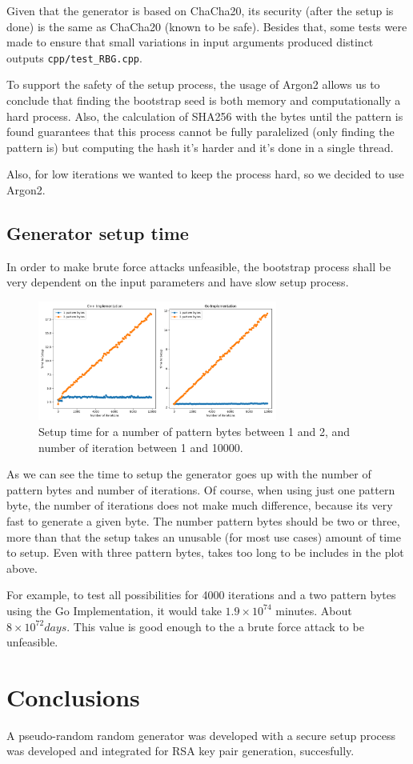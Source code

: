 \documentclass{article} %
\begin{document}
Given that the generator is based on ChaCha20, its security (after the setup is done) is the same as ChaCha20 (known to be safe). Besides that, some tests were made to ensure that small variations in input arguments produced distinct outputs \texttt{cpp/test\_RBG.cpp}.

To support the safety of the setup process, the usage of Argon2 allows us to conclude that finding the bootstrap seed is both memory and computationally a hard process. Also, the calculation of SHA256 with the bytes until the pattern is found guarantees that this process cannot be fully paralelized (only finding the pattern is) but computing the hash it's harder and it's done in a single thread.

Also, for low iterations we wanted to keep the process hard, so we decided to use Argon2.
\subsection{Generator setup time}
In order to make brute force attacks unfeasible, the bootstrap process shall be very dependent on the input parameters and have slow setup process.

\begin{figure}[!ht]
  \label{figure:apache_headers}
  \centering
  \includegraphics[width=0.7\textwidth]{assets/randgen_plot1.png}
  \caption{Setup time for a number of pattern bytes between 1 and 2, and number of iteration between 1 and 10000.}
\end{figure}

As we can see the time to setup the generator goes up with the number of pattern bytes and number of iterations. Of course, when using 
just one pattern byte, the number of iterations does not make much difference, because its very fast to generate a given byte. The number pattern bytes
should be two or three, more than that the setup takes an unusable (for most use cases) amount of time to setup. Even with three pattern bytes, takes too long
to be includes in the plot above.

For example, to test all possibilities for 4000 iterations and a two pattern bytes using the Go Implementation, it would take $1.9 \times 10^{74}$ minutes. About $8 \times 10^{72} days$.
This value is good enough to the a brute force attack to be unfeasible.


\section{Conclusions}
A pseudo-random random generator was developed with a secure setup process was developed and integrated for RSA key pair generation, succesfully.
\end{document}
